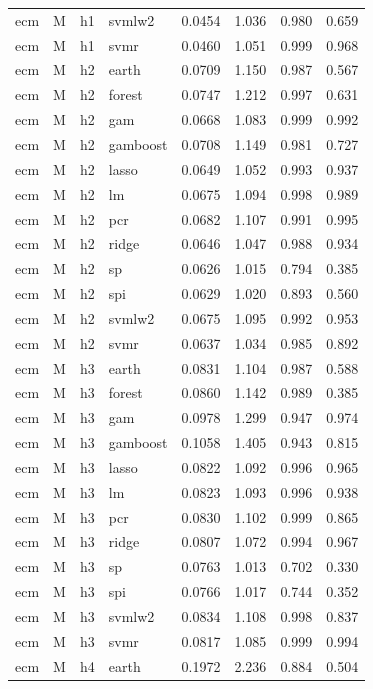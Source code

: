 \begin{ThreePartTable}
\begin{longtable}[t]{llclcccc}
ecm & M & h1 & svmlw2 & 0.0454 & 1.036 & 0.980 & 0.659\\
ecm & M & h1 & svmr & 0.0460 & 1.051 & 0.999 & 0.968\\
\addlinespace
ecm & M & h2 & earth & 0.0709 & 1.150 & 0.987 & 0.567\\
ecm & M & h2 & forest & 0.0747 & 1.212 & 0.997 & 0.631\\
ecm & M & h2 & gam & 0.0668 & 1.083 & 0.999 & 0.992\\
ecm & M & h2 & gamboost & 0.0708 & 1.149 & 0.981 & 0.727\\
ecm & M & h2 & lasso & 0.0649 & 1.052 & 0.993 & 0.937\\
ecm & M & h2 & lm & 0.0675 & 1.094 & 0.998 & 0.989\\
ecm & M & h2 & pcr & 0.0682 & 1.107 & 0.991 & 0.995\\
ecm & M & h2 & ridge & 0.0646 & 1.047 & 0.988 & 0.934\\
ecm & M & h2 & sp & 0.0626 & 1.015 & 0.794 & 0.385\\
ecm & M & h2 & spi & 0.0629 & 1.020 & 0.893 & 0.560\\
ecm & M & h2 & svmlw2 & 0.0675 & 1.095 & 0.992 & 0.953\\
ecm & M & h2 & svmr & 0.0637 & 1.034 & 0.985 & 0.892\\
\addlinespace
ecm & M & h3 & earth & 0.0831 & 1.104 & 0.987 & 0.588\\
ecm & M & h3 & forest & 0.0860 & 1.142 & 0.989 & 0.385\\
ecm & M & h3 & gam & 0.0978 & 1.299 & 0.947 & 0.974\\
ecm & M & h3 & gamboost & 0.1058 & 1.405 & 0.943 & 0.815\\
ecm & M & h3 & lasso & 0.0822 & 1.092 & 0.996 & 0.965\\
ecm & M & h3 & lm & 0.0823 & 1.093 & 0.996 & 0.938\\
ecm & M & h3 & pcr & 0.0830 & 1.102 & 0.999 & 0.865\\
ecm & M & h3 & ridge & 0.0807 & 1.072 & 0.994 & 0.967\\
ecm & M & h3 & sp & 0.0763 & 1.013 & 0.702 & 0.330\\
ecm & M & h3 & spi & 0.0766 & 1.017 & 0.744 & 0.352\\
ecm & M & h3 & svmlw2 & 0.0834 & 1.108 & 0.998 & 0.837\\
ecm & M & h3 & svmr & 0.0817 & 1.085 & 0.999 & 0.994\\
\addlinespace
ecm & M & h4 & earth & 0.1972 & 2.236 & 0.884 & 0.504\\

\end{longtable}
\end{ThreePartTable}
